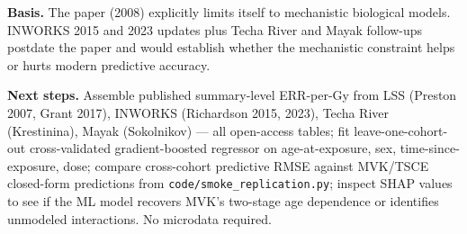 \textbf{Basis.} The paper (2008) explicitly limits itself to mechanistic
biological models. INWORKS 2015 and 2023 updates plus Techa River and
Mayak follow-ups postdate the paper and would establish whether the
mechanistic constraint helps or hurts modern predictive accuracy.

\textbf{Next steps.} Assemble published summary-level ERR-per-Gy from
LSS (Preston 2007, Grant 2017), INWORKS (Richardson 2015, 2023), Techa
River (Krestinina), Mayak (Sokolnikov) --- all open-access tables; fit
leave-one-cohort-out cross-validated gradient-boosted regressor on
age-at-exposure, sex, time-since-exposure, dose; compare cross-cohort
predictive RMSE against MVK/TSCE closed-form predictions from
\texttt{code/smoke\_replication.py}; inspect SHAP values to see if the
ML model recovers MVK's two-stage age dependence or identifies unmodeled
interactions. No microdata required.
